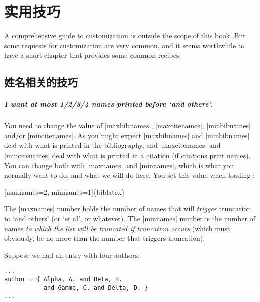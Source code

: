 \chapter{实用技巧}\label{ch:recipes}

A comprehensive guide to customization is outside the scope of this
book. But some requests for customization are very common, and it
seems worthwhile to have a short chapter that provides some common
recipes.

\section{姓名相关的技巧}

\paragraph{I want at most 1/2/3/4 names printed before `and
  others'.}\label{recipes:maxnames} You need to change the value of
|maxbibnames|, |maxcitenames|, |minbibnames| and/or |mincitenames|. As
you might expect |maxbibnames| and |minbibnames| deal with what is
printed in the bibliography, and |maxcitenames| and |mincitenames|
deal with what is printed in a citation (if citations print
names). You can change both with |maxnames| and |minnames|, which is
what you normally want to do, and what we will do here. You set this
value when loading \biblatex:
\begin{pseudoverb}
[maxnames=2, minnames=1]\{biblatex\}
\end{pseudoverb}

The |maxnames| number holds the number of names that will
\emph{trigger} truncation to `and others' (or `et al', or
whatever). The |minnames| number is the number of names \emph{to which
  the list will be truncated if truncation occurs} (which must,
obviously, be no more than the number that triggers truncation).

Suppose we had an entry with four authors:
\begin{Verbatim}
...
author = { Alpha, A. and Beta, B.
           and Gamma, C. and Delta, D. }
...
\end{Verbatim}

